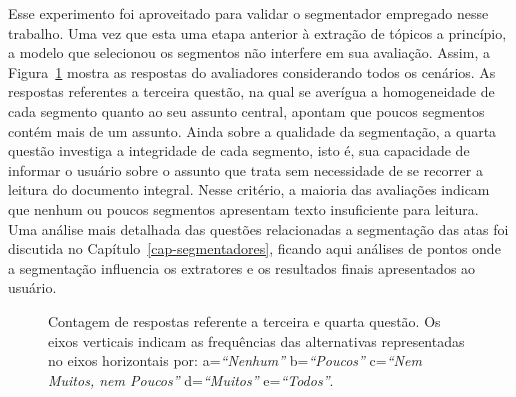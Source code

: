 Esse experimento foi aproveitado para validar o segmentador empregado nesse trabalho. Uma vez que esta uma etapa anterior à extração de tópicos a princípio, a modelo que selecionou os segmentos não interfere em sua avaliação. Assim, a Figura~\ref{fig:Q3e4} mostra as respostas do avaliadores considerando todos os cenários. As respostas referentes a terceira questão, na qual se averígua a homogeneidade de cada segmento quanto ao seu assunto central, apontam que poucos segmentos contém mais de um assunto.
Ainda sobre a qualidade da segmentação, a quarta questão investiga a integridade de cada segmento, isto é, sua capacidade de informar o usuário sobre o assunto que trata sem necessidade de se recorrer a leitura do documento integral. Nesse critério, a maioria das avaliações indicam que nenhum ou poucos segmentos apresentam texto insuficiente para leitura.  Uma análise mais detalhada das questões relacionadas a segmentação das atas foi discutida no Capítulo~\ref{cap-segmentadores}, ficando aqui análises de pontos onde a segmentação influencia os extratores e os resultados finais apresentados ao usuário.


\begin{figure}[!h] \centering     %

	\caption{Contagem de respostas referente a terceira e quarta questão. Os eixos verticais indicam as frequências das alternativas representadas no eixos horizontais por:
		a=\textit{``Nenhum''}
		b=\textit{``Poucos''}
		c=\textit{``Nem Muitos, nem Poucos''}
		d=\textit{``Muitos''}
		e=\textit{``Todos''}.
	}
	\label{fig:Q3e4}
\end{figure}


